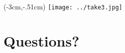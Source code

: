 \documentclass[10pt, compress]{beamer}
\begin{document}
\begin{frame}
\begin{textblock*}{20cm}(-3cm,-.51cm) %
\texttt{[image: ../take3.jpg]}
\end{textblock*}
\end{frame}







\section{Questions?}
\end{document}
